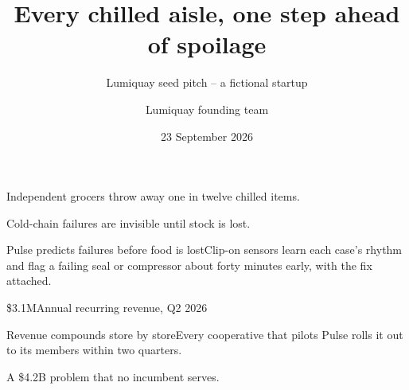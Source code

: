 \documentclass[theme=venture,publication-type=presentation]{reportkit-slides}
\title{Every chilled aisle, one step ahead of spoilage}
\subtitle{Lumiquay seed pitch -- a fictional startup}
\author{Lumiquay founding team}
\date{23 September 2026}
\begin{document}
\begin{frame}[plain]
  \begin{titleslide}
  \end{titleslide}
\end{frame}

\begin{frame}[plain]
  \begin{messageslide}{Independent grocers throw away one in twelve chilled items.}
    
  \end{messageslide}
\end{frame}

\begin{frame}
  \begin{assertionslide}[kicker={Problem}]{Cold-chain failures are invisible until stock is lost.}
    
  \end{assertionslide}
\end{frame}

\begin{frame}
  \begin{visualtext}[right]{Pulse predicts failures before food is lost}{Clip-on sensors learn each case's rhythm and flag a failing seal or compressor about forty minutes early, with the fix attached.}
    
  \end{visualtext}
\end{frame}

\begin{frame}
  \begin{herometric}{\$3.1M}{Annual recurring revenue, Q2 2026}
    
  \end{herometric}
\end{frame}

\begin{frame}
  \begin{chartslide}[left]{Revenue compounds store by store}{Every cooperative that pilots Pulse rolls it out to its members within two quarters.}
    
  \end{chartslide}
\end{frame}

\begin{frame}
  \begin{assertionslide}[kicker={Market}]{A \$4.2B problem that no incumbent serves.}
    
  \end{assertionslide}
\end{frame}
\end{document}
